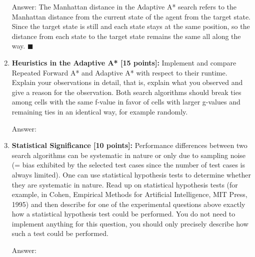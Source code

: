 \documentclass[12pt]{article}
\begin{document}
\begin{enumerate}
  {\color{blue}Answer: 
  The Manhattan distance in the Adaptive A* search refers to the Manhattan distance from the current state of the agent from the target state. Since the target state is still and each state stays at the same position, so the distance from each state to the target state remains the same all along the way. 
  $\blacksquare$\\
   }
     

  \item \textbf{Heuristics in the Adaptive A* [15 points]:} Implement and compare Repeated Forward A* and Adaptive A* with respect to their runtime. Explain your observations in detail, that is, explain what you observed and give a reason for the observation. Both search algorithms should break ties among cells with the same f-value in favor of cells with larger g-values and remaining ties in an identical way, for example randomly.

    
   {\color{blue}Answer: 
    }

  
  
  \item \textbf{Statistical Significance [10 points]:} Performance differences between two search algorithms can be systematic in nature or only due to sampling noise (= bias exhibited by the selected test cases since the number of test cases is always limited). One can use statistical hypothesis tests to determine whether they are systematic in nature. Read up on statistical hypothesis tests (for example, in Cohen, Empirical Methods for Artificial Intelligence, MIT Press, 1995) and then describe for one of the experimental questions above exactly how a statistical hypothesis test could be performed. You do not need to implement anything for this question, you should only precisely describe how such a test could be performed.
    
  {\color{blue}Answer: 
  }
  


\end{enumerate}
\end{document}
